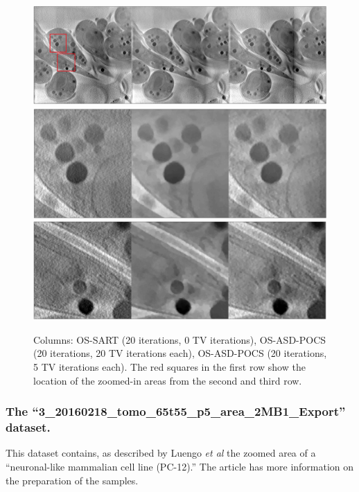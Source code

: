 \begin{figure}
\begin{center}

\includegraphics[width=\textwidth]{Applications/OSSART_0_20_5_TViters.png} 
\includegraphics[width=\textwidth]{Applications/OSSART_0_20_5_TVitersz1.png} 
\includegraphics[width=\textwidth]{Applications/OSSART_0_20_5_TVitersz2.png} 

\end{center}

\caption[Cell image recosntructed with different algorithms 1-3]{\label{fig:OStv}Columns: OS-SART (20 iterations, 0 TV iterations), OS-ASD-POCS (20 iterations, 20 TV iterations each), OS-ASD-POCS (20 iterations, 5 TV iterations each). The red squares in the first row show the location of the zoomed-in areas from the second and third row.} 
\end{figure}

\FloatBarrier

\subsubsection{The ``3\_20160218\_tomo\_65t55\_p5\_area\_2MB1\_Export'' dataset.} This dataset contains, as described by Luengo \textit{et al}\cite{LUENGO201743} the zoomed area of a ``neuronal-like mammalian cell line (PC-12\cite{apostol2003cell}).'' The article has more information on the preparation of the samples.

